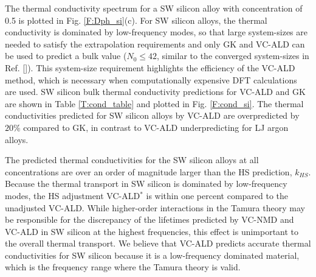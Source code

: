 \documentclass[aps,prb,onecolumn,preprint,footinbib,superscriptaddress,amsmath,amssymb,floatfix]{revtex4}
\begin{document}
The thermal conductivity spectrum for a SW silicon alloy with 
concentration of 0.5 is plotted in Fig. \ref{F:Dph_si}(c). 
For SW silicon alloys, the thermal conductivity is dominated by 
low-frequency modes, so that large system-sizes are needed to satisfy 
the extrapolation requirements and only GK and VC-ALD can be used to 
predict a bulk value ($N_0 \le 42$,  similar to the converged 
system-sizes in Ref. []). 
This system-size requirement highlights the efficiency of the 
VC-ALD method, which is necessary when computationally expensive 
DFT calculations are used.
\cite{esfarjani_method_2008,garg_role_2011,tian_phonon_2012,
lindsay_thermal_2012,esfarjani_heat_2011,chaput_phonon-phonon_2011}
SW silicon bulk thermal conductivity 
predictions for VC-ALD and GK are shown in Table \ref{T:cond_table} and 
plotted in Fig. \ref{F:cond_si}. The thermal conductivities predicted 
for SW silicon alloys by VC-ALD are overpredicted by $20\%$ compared 
to GK, in contrast to VC-ALD underpredicting for LJ argon alloys.
\cite{vc_fn7_2013}  

The predicted thermal conductivities for the SW silicon alloys at 
all concentrations are over an order of magnitude larger than
the HS prediction, $k_{HS}$. Because the thermal transport in SW silicon 
is dominated by low-frequency modes, the HS adjustment  
VC-ALD$^*$ is within one percent compared 
to the unadjusted VC-ALD. 
While higher-order interactions in the Tamura theory 
may be responsible for the 
discrepancy of the lifetimes predicted by VC-NMD and VC-ALD in SW silicon 
at the highest frequencies, 
this effect is unimportant to the overall
thermal transport. We believe that VC-ALD predicts accurate thermal 
conductivities for SW silicon because it is a low-frequency 
dominated material, which is the frequency range where the Tamura theory 
is valid.\cite{tamura_isotope_1983} 

\end{document}
